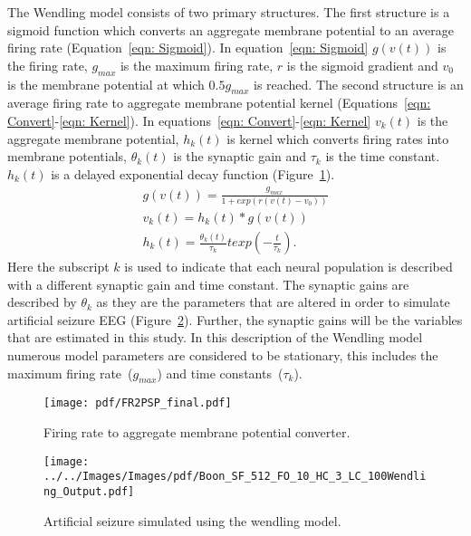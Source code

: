 The Wendling model consists of two primary structures. The first structure is a sigmoid function which converts an aggregate membrane potential to an average firing rate (Equation~\ref{eqn: Sigmoid}). In equation~\ref{eqn: Sigmoid} $g(v(t))$ is the firing rate, $g_{max}$ is the maximum firing rate, $r$ is the sigmoid gradient and $v_{0}$ is the membrane potential at which $0.5g_{max}$ is reached. The second structure is an average firing rate to aggregate membrane potential kernel (Equations~\ref{eqn: Convert}-\ref{eqn: Kernel}). In equations~\ref{eqn: Convert}-\ref{eqn: Kernel} $v_k(t)$ is the aggregate membrane potential, $h_{k}(t)$ is kernel which converts firing rates into membrane potentials, $\theta_{k}(t)$ is the synaptic gain and $\tau_{k}$ is the time constant. $h_{k}(t)$ is a delayed exponential decay function (Figure~\ref{fig: FR2PSP_final}).\begin{align}%
\label{eqn: Sigmoid}
g(v(t)) = \frac{g_{max}}{1+exp(r(v(t)-v_{0}))}\\
\label{eqn: Convert}
v_{k}(t) = h_{k}(t)*g(v(t))\\
\label{eqn: Kernel} 
h_{k}(t) = \frac{\theta_{k}(t)}{\tau_{k}}texp\left(-\frac{t}{\tau_{k}}\right).
\end{align} Here the subscript $k$ is used to indicate that each neural population is described with a different synaptic gain and time constant. The synaptic gains are described by $\theta_{k}$ as they are the parameters that are altered in order to simulate artificial seizure EEG (Figure~\ref{fig: SeizureSim}). Further, the synaptic gains will be the variables that are estimated in this study. In this description of the Wendling model numerous model parameters are considered to be stationary, this includes the maximum firing rate~($g_{max}$) and time constants~($\tau_{k}$). 
\begin{figure}%
	\centering
		\texttt{[image: pdf/FR2PSP\_final.pdf]}
	\caption{Firing rate to aggregate membrane potential converter.}
	\label{fig: FR2PSP_final}
\end{figure} 
\begin{figure}%
	\centering
		\texttt{[image: ../../Images/Images/pdf/Boon\_SF\_512\_FO\_10\_HC\_3\_LC\_100Wendling\_Output.pdf]}
	\caption{Artificial seizure simulated using the wendling model.}
	\label{fig: SeizureSim}
\end{figure}
